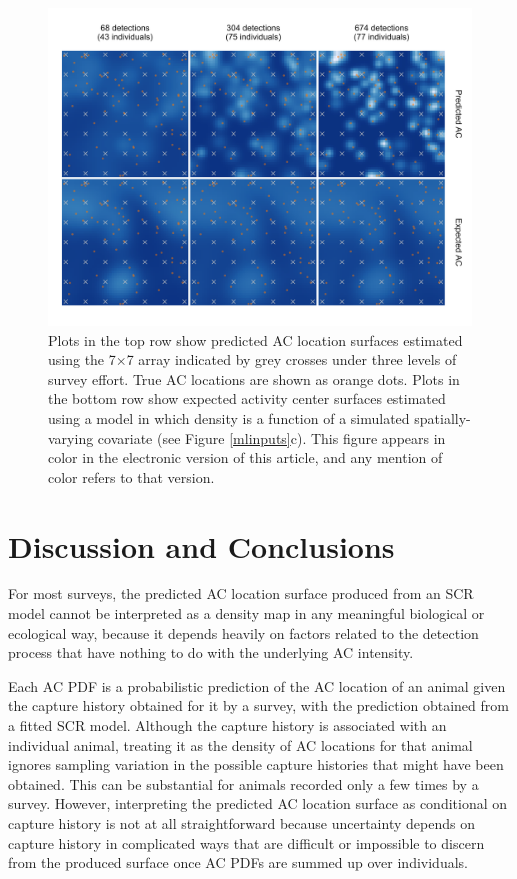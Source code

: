 \documentclass[useAMS,usenatbib,referee]{biom}
\begin{document}
\begin{figure}[htbp]
\centering
\includegraphics[width=1\textwidth]{mona_7x7.png}
\caption{Plots in the top row show predicted AC location surfaces estimated using the 7$\times$7 array indicated by grey crosses under three levels of survey effort. True AC locations are shown as orange dots. Plots in the bottom row show expected activity center surfaces estimated using a model in which density is a function of a simulated spatially-varying covariate (see Figure \ref{mlinputs}c). This figure appears in color in the electronic version of this article, and any mention of color refers to that version.}
\label{mona7x7}
\end{figure}

\section{Discussion and Conclusions} \label{discussion}
For most surveys, the predicted AC location surface produced from an SCR model cannot be interpreted as a density map in any meaningful biological or ecological way, because it depends heavily on factors related to the detection process that have nothing to do with the underlying AC intensity. 

Each AC PDF is a probabilistic prediction of the AC location of an animal given the capture history obtained for it by a survey, with the prediction obtained from a fitted SCR model. Although the capture history is associated with an individual animal, treating it as the density of AC locations for that animal ignores sampling variation in the possible capture histories that might have been obtained. This can be substantial for animals recorded only a few times by a survey. However, interpreting the predicted AC location surface as conditional on capture history is not at all straightforward because uncertainty depends on capture history in complicated ways that are difficult or impossible to discern from the produced surface once AC PDFs are summed up over individuals. 
\end{document}
